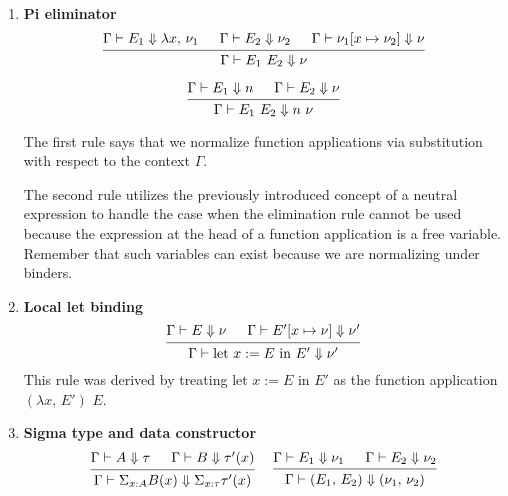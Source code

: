 \documentclass{article}
\begin{document}
\begin{enumerate}
\item \textbf{Pi eliminator} \\
  \[
    \begin{prooftree}
      \hypo{\Gamma \vdash E_1 \Downarrow \lambda x, \, \nu_1}
      \hypo{\Gamma \vdash E_2 \Downarrow \nu_2}
      \hypo{\Gamma \vdash \nu_1[x \mapsto \nu_2] \Downarrow \nu}
      \infer3{\Gamma \vdash E_1 \,\, E_2 \Downarrow \nu}
    \end{prooftree}
  \]

  \[
    \begin{prooftree}
      \hypo{\Gamma \vdash E_1 \Downarrow n}
      \hypo{\Gamma \vdash E_2 \Downarrow \nu}
      \infer2{\Gamma \vdash E_1 \,\, E_2 \Downarrow n \,\, \nu}
    \end{prooftree}
  \]

  The first rule says that we normalize function applications via
  substitution with respect to the context $\Gamma$.

  The second rule utilizes the previously introduced concept of a neutral
  expression to handle the case when the elimination rule cannot be used because
  the expression at the head of a function application is a free variable.
  Remember that such variables can exist because we are normalizing under
  binders.

\item \textbf{Local let binding} \\
    \[
      \begin{prooftree}
        \hypo{\Gamma \vdash E \Downarrow \nu}
        \hypo{\Gamma \vdash E'[x \mapsto \nu] \Downarrow \nu'}
        \infer2{\Gamma \vdash \text{let } x := E \text{ in } E' \Downarrow \nu'}
      \end{prooftree}
    \]
    This rule was derived by treating $\text{let } x := E \text{ in } E'$ as
    the function application $(\lambda x, \, E') \,\, E$.

\item \textbf{Sigma type and data constructor} \\
    \begin{gather*}
      \begin{prooftree}
        \hypo{\Gamma \vdash A \Downarrow \tau}
        \hypo{\Gamma \vdash B \Downarrow \tau'(x)}
        \infer2{\Gamma \vdash \Sigma_{x : A}B(x) \Downarrow \Sigma_{x : \tau}\tau'(x)}
      \end{prooftree}
      ~ \quad
      \begin{prooftree}
        \hypo{\Gamma \vdash E_1 \Downarrow \nu_1}
        \hypo{\Gamma \vdash E_2 \Downarrow \nu_2}
        \infer2{\Gamma \vdash (E_1, \, E_2) \Downarrow (\nu_1, \, \nu_2)}
      \end{prooftree}
    \end{gather*}


\end{enumerate}
\end{document}
